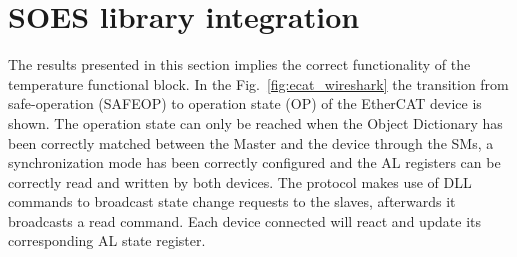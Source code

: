 \section{SOES library integration}

The results presented in this section implies the correct functionality of the temperature functional block.
In the Fig.~\ref{fig:ecat_wireshark} the transition from safe-operation (SAFEOP) to operation state (OP) of the EtherCAT device is shown. 
The operation state can only be reached when the Object Dictionary has been correctly matched between the Master and the device
through the SMs, a synchronization mode has been correctly configured and the AL registers can be correctly read and written 
by both devices. The protocol makes use of DLL commands to broadcast state change requests to the slaves, afterwards it broadcasts 
a read command. Each device connected will react and update its corresponding AL state register. 

